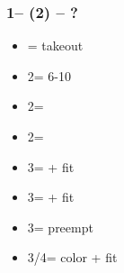 \documentclass[12pt, a4paper]{article}
\begin{document}
\subsubsection*{1\hearts -- (2\diams) -- ?}
\begin{itemize}
    \item \dbl = takeout
    \item 2\hearts = 6-10
    \item 2\spades = \fonce
    \item 2\nt = \clubs \invp
    \item 3\clubs = \gf + fit
    \item 3\diams = \inv + fit
    \item 3\hearts = preempt
    \item 3\spades/4\clubs = color + fit
\end{itemize}

\end{document}

